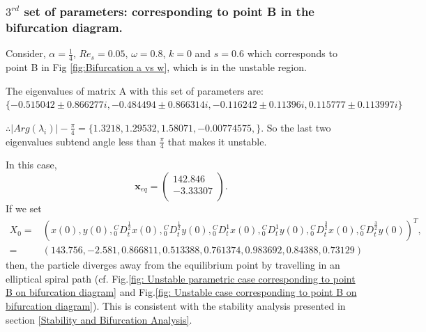 \documentclass[pdflatex,sn-mathphys]{sn-jnl}%
\theoremstyle{thmstyleone}%
\theoremstyle{thmstyletwo}%
\theoremstyle{thmstylethree}%
\begin{document}
\subsubsection{$3^{rd}$ set of parameters: corresponding to point B in the bifurcation diagram.} \label{$3^{rd}$ set}
Consider,  $\alpha = \frac{1}{4}$,  $Re_{s}=0.05$,  $\omega=0.8$, $k=0$ and $s=0.6$ which corresponds to point B in Fig \ref{fig:Bifurcation a vs w}, which is in the unstable region.

The eigenvalues of matrix A with this set of parameters are: $\{-0.515042 \pm 0.866277 i, -0.484494 \pm 0.866314 i,-0.116242 \pm 0.11396 i, 0.115777 \pm 0.113997 i\}$

$\therefore \vert Arg(\lambda_{i})\vert -\frac{\pi}{4}=\{1.3218,1.29532,1.58071,-0.00774575,\}$. So the last two eigenvalues subtend angle less than $\frac{\pi}{4}$ that makes it unstable.

In this case,
$$\mathbf{x}_{eq}=
\left(
\begin{array}{c}
 142.846 \\
-3.33307 \\
\end{array}
\right).$$
If we set 
\begin{align*}
X_{0}=&
\left(
x(0) ,
y(0) ,
{ }_{0}^{C}D_{t}^{\frac{1}{2}}x(0) ,
{ }_{0}^{C}D_{t}^{\frac{1}{2}}y(0) ,
{ }_{0}^{C}D_{t}^{1} x(0) ,
{ }_{0}^{C}D_{t}^{1}y(0) ,
{ }_{0}^{C}D_{t}^{\frac{3}{2}}x(0) ,
{ }_{0}^{C}D_{t}^{\frac{3}{2}}y(0)
\right)^T, \\ =& \left(
 143.756,
 -2.581,
 0.866811,
 0.513388,
 0.761374,
 0.983692,
 0.84388,
 0.73129 
\right)
\end{align*} 
then, the particle diverges away from the equilibrium point by travelling in an elliptical spiral path (cf. Fig.\ref{fig: Unstable parametric case corresponding to point B on bifurcation diagram} and Fig.\ref{fig: Unstable case corresponding to point B on bifurcation diagram}). This is consistent with the stability analysis presented in section \ref{Stability and Bifurcation Analysis}.
\end{document}
